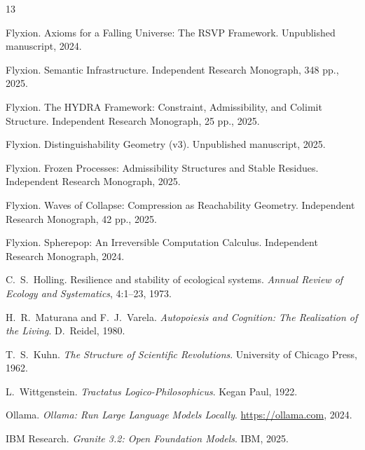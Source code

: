 \documentclass[12pt, a4paper]{article}
\theoremstyle{principle}
\theoremstyle{definition}
\begin{document}
\begin{thebibliography}{13}

Flyxion.
\newblock Axioms for a Falling Universe: The RSVP Framework.
\newblock Unpublished manuscript, 2024.

Flyxion.
\newblock Semantic Infrastructure.
\newblock Independent Research Monograph, 348 pp., 2025.

Flyxion.
\newblock The HYDRA Framework: Constraint, Admissibility, and Colimit Structure.
\newblock Independent Research Monograph, 25 pp., 2025.

Flyxion.
\newblock Distinguishability Geometry (v3).
\newblock Unpublished manuscript, 2025.

Flyxion.
\newblock Frozen Processes: Admissibility Structures and Stable Residues.
\newblock Independent Research Monograph, 2025.

Flyxion.
\newblock Waves of Collapse: Compression as Reachability Geometry.
\newblock Independent Research Monograph, 42 pp., 2025.

Flyxion.
\newblock Spherepop: An Irreversible Computation Calculus.
\newblock Independent Research Monograph, 2024.

C.~S.~Holling.
\newblock Resilience and stability of ecological systems.
\newblock \emph{Annual Review of Ecology and Systematics}, 4:1--23, 1973.

H.~R.~Maturana and F.~J.~Varela.
\newblock \emph{Autopoiesis and Cognition: The Realization of the Living}.
\newblock D.\ Reidel, 1980.

T.~S.~Kuhn.
\newblock \emph{The Structure of Scientific Revolutions}.
\newblock University of Chicago Press, 1962.

L.~Wittgenstein.
\newblock \emph{Tractatus Logico-Philosophicus}.
\newblock Kegan Paul, 1922.

Ollama.
\newblock \emph{Ollama: Run Large Language Models Locally}.
\newblock \url{https://ollama.com}, 2024.

IBM Research.
\newblock \emph{Granite 3.2: Open Foundation Models}.
\newblock IBM, 2025.

\end{thebibliography}
\end{document}
